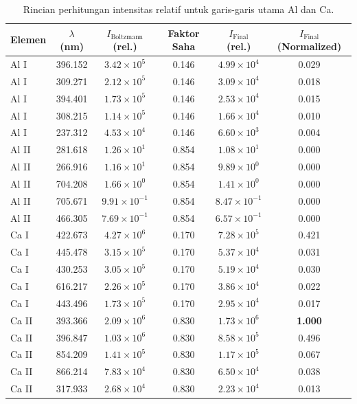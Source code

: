 \begin{table}[H]
    \centering
    \caption{Rincian perhitungan intensitas relatif untuk garis-garis utama Al dan Ca.}
    \label{tab:intensity_calculation}
    \small
    \begin{tabular}{lccccc}
        \toprule
        \textbf{Elemen} & \textbf{$\lambda$ (nm)} & \textbf{$I_{\text{Boltzmann}}$ (rel.)} & \textbf{Faktor Saha} & \textbf{$I_{\text{Final}}$ (rel.)} & \textbf{$I_{\text{Final}}$ (Normalized)} \\
        \midrule
        Al I  & 396.152 & $3.42 \times 10^5$ & 0.146 & $4.99 \times 10^4$ & 0.029 \\
        Al I  & 309.271 & $2.12 \times 10^5$ & 0.146 & $3.09 \times 10^4$ & 0.018 \\
        Al I  & 394.401 & $1.73 \times 10^5$ & 0.146 & $2.53 \times 10^4$ & 0.015 \\
        Al I  & 308.215 & $1.14 \times 10^5$ & 0.146 & $1.66 \times 10^4$ & 0.010 \\
        Al I  & 237.312 & $4.53 \times 10^4$ & 0.146 & $6.60 \times 10^3$ & 0.004 \\
        \midrule
        Al II & 281.618 & $1.26 \times 10^1$ & 0.854 & $1.08 \times 10^1$ & 0.000 \\
        Al II & 266.916 & $1.16 \times 10^1$ & 0.854 & $9.89 \times 10^0$ & 0.000 \\
        Al II & 704.208 & $1.66 \times 10^0$ & 0.854 & $1.41 \times 10^0$ & 0.000 \\
        Al II & 705.671 & $9.91 \times 10^{-1}$ & 0.854 & $8.47 \times 10^{-1}$ & 0.000 \\
        Al II & 466.305 & $7.69 \times 10^{-1}$ & 0.854 & $6.57 \times 10^{-1}$ & 0.000 \\
        \midrule
        Ca I  & 422.673 & $4.27 \times 10^6$ & 0.170 & $7.28 \times 10^5$ & 0.421 \\
        Ca I  & 445.478 & $3.15 \times 10^5$ & 0.170 & $5.37 \times 10^4$ & 0.031 \\
        Ca I  & 430.253 & $3.05 \times 10^5$ & 0.170 & $5.19 \times 10^4$ & 0.030 \\
        Ca I  & 616.217 & $2.26 \times 10^5$ & 0.170 & $3.86 \times 10^4$ & 0.022 \\
        Ca I  & 443.496 & $1.73 \times 10^5$ & 0.170 & $2.95 \times 10^4$ & 0.017 \\
        \midrule
        Ca II & 393.366 & $2.09 \times 10^6$ & 0.830 & $1.73 \times 10^6$ & \textbf{1.000} \\
        Ca II & 396.847 & $1.03 \times 10^6$ & 0.830 & $8.58 \times 10^5$ & 0.496 \\
        Ca II & 854.209 & $1.41 \times 10^5$ & 0.830 & $1.17 \times 10^5$ & 0.067 \\
        Ca II & 866.214 & $7.83 \times 10^4$ & 0.830 & $6.50 \times 10^4$ & 0.038 \\
        Ca II & 317.933 & $2.68 \times 10^4$ & 0.830 & $2.23 \times 10^4$ & 0.013 \\
        \bottomrule
    \end{tabular}
\end{table}
